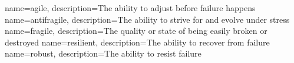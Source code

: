 
{
	name=agile,
	description={The ability to adjust before failure happens}
}
{
	name=antifragile,
	description={The ability to strive for and evolve under stress}
}
{
	name=fragile,
	description={The quality or state of being easily broken or destroyed}
}
{
	name=resilient,
	description={The ability to recover from failure}
}
{
	name=robust,
	description={The ability to resist failure}
}

